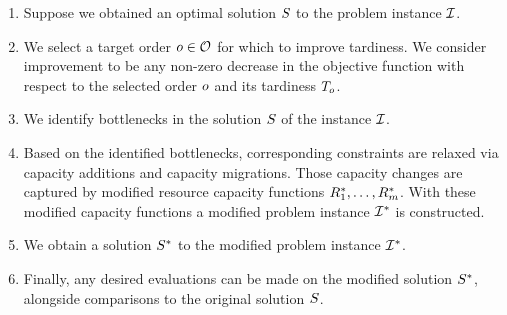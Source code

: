 \begin{enumerate}
    \item Suppose we obtained an optimal solution $S$ to the problem instance $\mathcal{I}$.

    \item We select a target order $o \in \mathcal{O}$ for which to improve tardiness.
        We consider improvement to be any non-zero decrease in the objective function with respect to the
        selected order $o$ and its tardiness $T_{o}$.

    \item We identify bottlenecks in the solution $S$ of the instance $\mathcal{I}$.

    \item Based on the identified bottlenecks, corresponding constraints are relaxed via
        capacity additions and capacity migrations.
        Those capacity changes are captured by modified resource capacity functions
        $R_{1}^*, \ldots, R_{m}^*$.
        With these modified capacity functions a modified problem instance $\mathcal{I}^*$ is constructed.

    \item We obtain a solution $S^*$ to the modified problem instance $\mathcal{I}^*$.

    \item Finally, any desired evaluations can be made on the modified solution $S^*$,
        alongside comparisons to the original solution $S$.
\end{enumerate}
